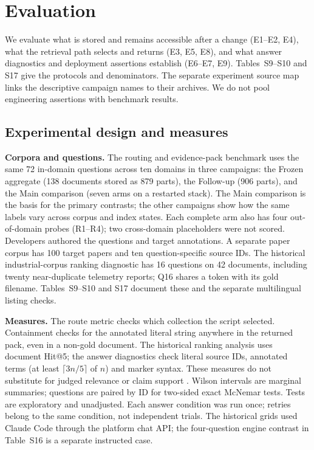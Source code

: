 \section{Evaluation}
\label{sec:eval}
We evaluate what is stored and remains accessible after a change (E1--E2,
E4), what the retrieval path selects and returns (E3, E5, E8), and what
answer diagnostics and deployment assertions establish (E6--E7, E9).
Tables~S9--S10 and S17 give the protocols and denominators. The separate
experiment source map links the descriptive campaign names to their
archives. We do not pool engineering assertions with benchmark results.

\subsection{Experimental design and measures}
\label{sec:eval-setup}

\textbf{Corpora and questions.} The routing and evidence-pack benchmark
uses the same 72 in-domain questions across ten domains in three campaigns:
the Frozen aggregate (138 documents stored as 879 parts), the Follow-up
(906 parts), and the Main comparison (seven arms on a restarted stack).
The Main comparison is the basis for the primary contrasts; the other
campaigns show how the same labels vary across corpus and index states. Each complete arm also has
four out-of-domain probes (R1--R4); two cross-domain placeholders were not
scored. Developers authored the questions and target annotations. A separate
paper corpus has 100 target papers and ten question-specific source IDs.
The historical industrial-corpus ranking diagnostic has 16 questions on
42 documents, including twenty near-duplicate telemetry reports; Q16 shares
a token with its gold filename. Tables~S9--S10 and S17 document these and
the separate multilingual listing checks.

\textbf{Measures.} The route metric checks which collection the script
selected. Containment checks for the annotated literal string anywhere in
the returned pack, even in a non-gold document. The historical ranking
analysis uses document Hit@5; the answer diagnostics check literal source
IDs, annotated terms (at least $\lceil 3n/5\rceil$ of $n$) and marker syntax.
These measures do not substitute for judged relevance or claim support
\citep{craswell-msmarco-2021,jarvelin-cumulated-gain-2002,es-ragas-2024,saad-falcon-ares-2024}.
Wilson intervals are marginal summaries; questions are paired by ID for
two-sided exact McNemar tests. Tests are exploratory and unadjusted.
Each answer condition was run once; retries belong to the same condition,
not independent trials. The historical grids used Claude Code through the
platform chat API; the four-question engine contrast in Table~S16 is a
separate instructed case.

